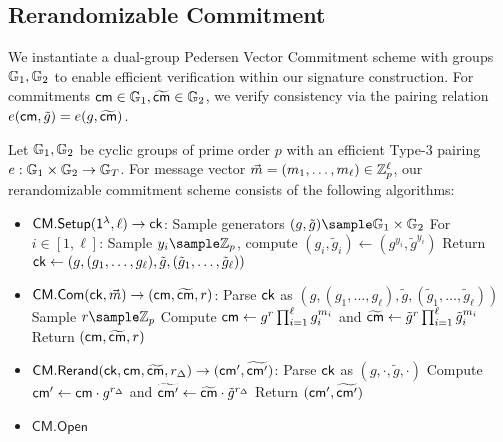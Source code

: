 \subsection{Rerandomizable Commitment}
We instantiate a dual-group Pedersen Vector Commitment scheme with groups $\mathbb{G}_1, \mathbb{G}_2$ to enable efficient verification within our signature construction. For commitments $\mathsf{cm} \in \mathbb{G}_1, \widetilde{\mathsf{cm}} \in \mathbb{G}_2$, we verify consistency via the pairing relation $e(\mathsf{cm}, \tilde{g}) = e(g, \widetilde{\mathsf{cm}})$.

Let $\mathbb{G}_1, \mathbb{G}_2$ be cyclic groups of prime order $p$ with an efficient Type-3 pairing $e: \mathbb{G}_1 \times \mathbb{G}_2 \to \mathbb{G}_T$. For message vector $\vec{m} = (m_1, \ldots, m_\ell) \in \mathbb{Z}_p^\ell$, our rerandomizable commitment scheme consists of the following algorithms:

\begin{itemize}
    \item $\mathsf{CM.Setup}(\mathsf{1^{\lambda}}, \ell) \to \mathsf{ck}$:
    Sample generators $(g, \tilde{g}) \sample \G_1 \times \G_2$
    For $i \in [1,\ell]$: Sample $y_i \sample \Z_p$, compute $(g_i, \tilde{g}_i) \gets (g^{y_i}, \tilde{g}^{y_i})$
    Return $\mathsf{ck} \gets (g, (g_1,\ldots,g_\ell), \tilde{g}, (\tilde{g}_1,\ldots,\tilde{g}_\ell))$
    
    \item $\mathsf{CM.Com}(\mathsf{ck}, \vec{m}) \to (\mathsf{cm}, \widetilde{\mathsf{cm}}, r)$:
    Parse $\mathsf{ck}$ as $(g, (g_1,\ldots,g_\ell), \tilde{g}, (\tilde{g}_1,\ldots,\tilde{g}_\ell))$
    Sample $r \sample \Z_p$
    Compute $\mathsf{cm} \gets g^r \prod_{i=1}^\ell g_i^{m_i}$ and $\widetilde{\mathsf{cm}} \gets \tilde{g}^r \prod_{i=1}^\ell \tilde{g}_i^{m_i}$
    Return $(\mathsf{cm}, \widetilde{\mathsf{cm}}, r)$
    
    \item $\mathsf{CM.Rerand}(\mathsf{ck}, \mathsf{cm}, \widetilde{\mathsf{cm}}, r_\Delta) \to (\mathsf{cm}', \widetilde{\mathsf{cm}'})$:
    Parse $\mathsf{ck}$ as $(g, \cdot, \tilde{g}, \cdot)$
    Compute $\mathsf{cm}' \gets \mathsf{cm} \cdot g^{r_\Delta}$ and $\widetilde{\mathsf{cm}'} \gets \widetilde{\mathsf{cm}} \cdot \tilde{g}^{r_\Delta}$
    Return $(\mathsf{cm}', \widetilde{\mathsf{cm}'})$

    \item $\mathsf{CM.Open}$
\end{itemize}




































